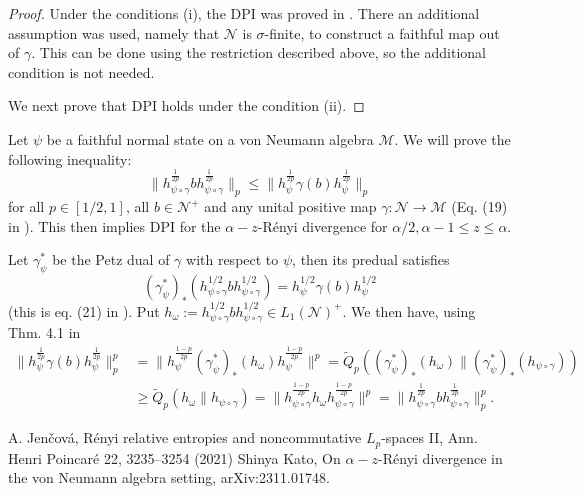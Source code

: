 \documentclass[12pt]{article}
\theoremstyle{definition}
\theoremstyle{remark}
\def\Me{\mathcal M}
\def\Ne{\mathcal N}
\begin{document}
\begin{proof} Under the conditions (i), the DPI was proved in \cite[Theorem 1
(viii)]{kato2023onrenyi}. There an additional assumption was used, namely  that $\Ne$ is
$\sigma$-finite, to construct a faithful map out of $\gamma$. This can be done using the
restriction described above, so the additional condition is not needed. 

We next prove that DPI holds under the condition (ii). 

\end{proof}












Let $\psi$ be a faithful normal state on a von Neumann algebra $\Me$. We will prove the following inequality:
\begin{equation}\label{eq:goal}
\|h_{\psi\circ\gamma}^{\frac{1}{2p}}bh_{\psi\circ\gamma}^{\frac{1}{2p}}\|_p\le
\|h_{\psi}^{\frac{1}{2p}}\gamma(b)h_{\psi}^{\frac{1}{2p}}\|_p
\end{equation}
for all $p\in [1/2,1]$, all $b\in \Ne^+$ and any unital positive  map $\gamma: \Ne\to
\Me$ (Eq. (19) in \cite{kato2023onrenyi}). This then implies DPI for the $\alpha-z$-R\'enyi divergence for
$\alpha/2,\alpha-1\le z\le \alpha$.

Let $\gamma_\psi^*$ be the Petz dual of $\gamma$ with respect to $\psi$, then 
its predual satisfies
\[
(\gamma^*_\psi)_*(h_{\psi\circ\gamma}^{1/2}bh_{\psi\circ\gamma}^{1/2})=h_\psi^{1/2}\gamma(b)h_\psi^{1/2}
\]
(this is eq. (21) in \cite{kato2023onrenyi}). Put
$h_\omega:=h_{\psi\circ\gamma}^{1/2}bh_{\psi\circ\gamma}^{1/2}\in L_1(\Ne)^+$. We then have, using Thm.
4.1 in \cite{jencova2021renyi}
\begin{align*}
\|h_{\psi}^{\frac{1}{2p}}\gamma(b)h_{\psi}^{\frac{1}{2p}}\|^p_p&=
\|h_\psi^{\frac{1-p}{2p}}(\gamma_\psi^*)_*(h_\omega)h_\psi^{\frac{1-p}{2p}}\|^p=\tilde
Q_p((\gamma_\psi^*)_*(h_\omega)\|(\gamma_\psi^*)_*(h_{\psi\circ\gamma}))\\
&\ge \tilde Q_p(h_\omega\|h_{\psi\circ\gamma})=\|
h_{\psi\circ\gamma}^{\frac{1-p}{2p}}h_\omega
h_{\psi\circ\gamma}^{\frac{1-p}{2p}}\|^p=\|h_{\psi\circ\gamma}^{\frac{1}{2p}}bh_{\psi\circ\gamma}^{\frac{1}{2p}}\|^p_p.
\end{align*}

\begin{thebibliography}{99}

 A. Jen\v cov\'a, Rényi relative entropies and noncommutative
$L_p$-spaces II, Ann. Henri Poincaré 22, 3235–3254 (2021)
 Shinya Kato, On $\alpha-z$-R\'enyi divergence in the von Neumann
algebra setting, arXiv:2311.01748.

\end{thebibliography}
\end{document}
